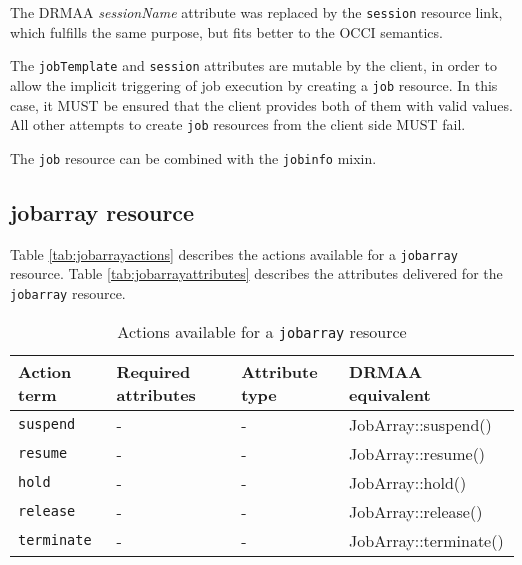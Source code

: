 \documentclass[10pt]{article}
\newcommand{\h}[1]{\lstinline|#1|}
\newcommand{\rat}[1]{}
\begin{document}
The DRMAA \emph{sessionName} attribute was replaced by the \h{session} resource link, which fulfills the same purpose, but fits better to the OCCI semantics.

The \h{jobTemplate} and \h{session} attributes are mutable by the client, in order to allow the implicit triggering of job execution by creating a \h{job} resource. In this case, it MUST be ensured that the client provides both of them with valid values. All other attempts to create \h{job} resources from the client side MUST fail.

\rat{Starting of bulk jobs through this would mess up to much.}

The \h{job} resource can be combined with the \h{jobinfo} mixin. 


\subsection{jobarray resource}

Table \ref{tab:jobarrayactions} describes the actions available for a \h{jobarray} resource. Table \ref{tab:jobarrayattributes} describes the attributes delivered for the \h{jobarray} resource.

\begin{table}[ht]
\centering
\begin{tabularx}{\textwidth}{|X|X|X|X|}
\hline
Action term         & Required attributes & Attribute type    & DRMAA equivalent \\
\hline
\h{suspend}         & -                   &  -                & JobArray::suspend() \\
\h{resume}          & -                   &  -                & JobArray::resume()  \\
\h{hold}            & -                   &  -                & JobArray::hold()    \\
\h{release}         & -                   &  -                & JobArray::release() \\
\h{terminate}       & -                   &  -                & JobArray::terminate() \\
\hline
\end{tabularx}
\caption{Actions available for a \h{jobarray} resource}
\label{tab:jobactions}
\end{table}
\end{document}
